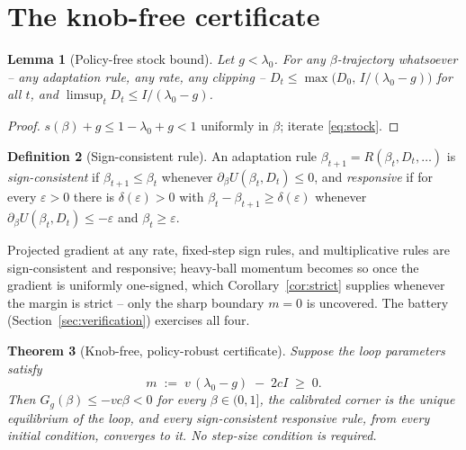\documentclass[11pt]{article}
\newtheorem{theorem}{Theorem}[section]
\newtheorem{lemma}[theorem]{Lemma}
\theoremstyle{definition}
\newtheorem{definition}[theorem]{Definition}
\theoremstyle{remark}
\numberwithin{equation}{section}
\begin{document}
\section{The knob-free certificate}\label{sec:certificate}

\begin{lemma}[Policy-free stock bound]\label{lem:bound}
Let $g<\lambda_0$. For \emph{any} $\beta$-trajectory whatsoever -- any adaptation rule, any rate, any clipping -- $D_t\le\max\bigl(D_0,\,I/(\lambda_0-g)\bigr)$ for all $t$, and $\limsup_t D_t\le I/(\lambda_0-g)$.
\end{lemma}

\begin{proof}
$s(\beta)+g\le 1-\lambda_0+g<1$ uniformly in $\beta$; iterate \eqref{eq:stock}.
\end{proof}

\begin{definition}[Sign-consistent rule]\label{def:sign}
An adaptation rule $\beta_{t+1}=R(\beta_t,D_t,\ldots)$ is \emph{sign-consistent} if $\beta_{t+1}\le\beta_t$ whenever $\partial_\beta U(\beta_t,D_t)\le 0$, and \emph{responsive} if for every $\varepsilon>0$ there is $\delta(\varepsilon)>0$ with $\beta_t-\beta_{t+1}\ge\delta(\varepsilon)$ whenever $\partial_\beta U(\beta_t,D_t)\le-\varepsilon$ and $\beta_t\ge\varepsilon$.
\end{definition}

Projected gradient at any rate, fixed-step sign rules, and multiplicative rules are sign-consistent and responsive; heavy-ball momentum becomes so once the gradient is uniformly one-signed, which Corollary~\ref{cor:strict} supplies whenever the margin is strict -- only the sharp boundary $m=0$ is uncovered. The battery (Section~\ref{sec:verification}) exercises all four.

\begin{theorem}[Knob-free, policy-robust certificate]\label{thm:cert}
Suppose the loop parameters satisfy
\begin{equation}\label{eq:cert}
m \;:=\; v\,(\lambda_0-g)\;-\;2cI \;\ge\; 0 .
\end{equation}
Then $G_g(\beta)\le -vc\beta<0$ for every $\beta\in(0,1]$, the calibrated corner is the unique equilibrium of the loop, and every sign-consistent responsive rule, from every initial condition, converges to it. No step-size condition is required.
\end{theorem}
\end{document}
